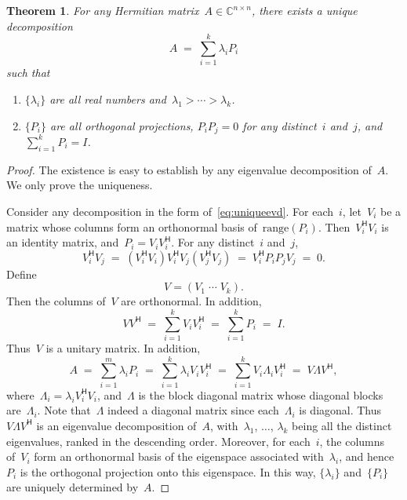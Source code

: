 \documentclass[11pt,a4paper]{article}
\newtheorem{theorem}{Theorem}%
\theoremstyle{definition}
\def\CC{\mathbb{C}}
\newcommand{\hmt}{{\scriptscriptstyle{{\mathsf{H}}}}}
\newcommand{\range}{\mathrm{range}}
\begin{document}
\begin{theorem}
  \label{th:uniqueevd}
  For any Hermitian matrix~$A \in\CC^{n\times n}$, there exists a unique decomposition
  \begin{equation}
    \label{eq:uniqueevd}
    A \;=\; \sum_{i=1}^k \lambda_i P_i
  \end{equation}
  such that
  \begin{enumerate}
    \item $\{\lambda_i\}$ are all real numbers and~$\lambda_1 > \cdots
      > \lambda_k$. 
    \item $\{P_i\}$ are all orthogonal projections, $P_iP_j = 0$ for any distinct~$i$ and~$j$,
      and~$\sum_{i=1}^k P_i = I$. 
  \end{enumerate}
\end{theorem}

\begin{proof}
  The existence is easy to establish by any eigenvalue decomposition of~$A$. We only prove the uniqueness. 

  Consider any decomposition in the form of~\eqref{eq:uniqueevd}. 
  For each~$i$, let~$V_i$ be a matrix whose columns form an orthonormal basis
  of~$\range(P_i)$. Then~$V_i^\hmt V_i$ is an identity matrix, and~$P_i = V_iV_i^\hmt$. For any
  distinct~$i$ and~$j$, 
  \begin{equation*}
    V_i^\hmt V_j \;=\;(V_i^\hmt V_i) V_i^\hmt V_j(V_j^\hmt V_j) \;=\; V_i^\hmt P_iP_j V_j\;=\; 0.
  \end{equation*}
  Define
  \begin{equation*}
    V = (V_1\; \cdots \; V_k).
  \end{equation*}
  Then the columns of~$V$ are orthonormal. In addition,
  \begin{equation*}
    VV^\hmt \;=\; \sum_{i=1}^k V_iV_i^\hmt \;=\; \sum_{i=1}^k P_i \;=\; I.
  \end{equation*}
  Thus~$V$ is a unitary matrix. In addition,
  \begin{equation*}
    A \;=\; \sum_{i=1}^m \lambda_i P_i \;=\; \sum_{i=1}^k\lambda_iV_iV_i^\hmt \;=\; \sum_{i=1}^k V_i\Lambda_iV_i^\hmt \;=\; V\Lambda V^\hmt,
  \end{equation*}
  where~$\Lambda_i = \lambda_i V_i^\hmt V_i$, and~$\Lambda$ is the block diagonal matrix whose
  diagonal blocks are~$\Lambda_i$. Note that~$\Lambda$ indeed a diagonal matrix since
  each~$\Lambda_i$ is diagonal. Thus~$V\Lambda V^\hmt$ is an eigenvalue decomposition of~$A$,
  with~$\lambda_1$, $\dots$, $\lambda_k$ being all the distinct eigenvalues, ranked in the descending
  order. Moreover, for
  each~$i$, the columns
  of~$V_i$ form an orthonormal basis of the eigenspace associated with~$\lambda_i$, and
  hence~$P_i$ is the orthogonal projection onto this eigenspace. In this way, $\{\lambda_i\}$
  and~$\{P_i\}$ are uniquely determined by~$A$.
\end{proof}
\end{document}
